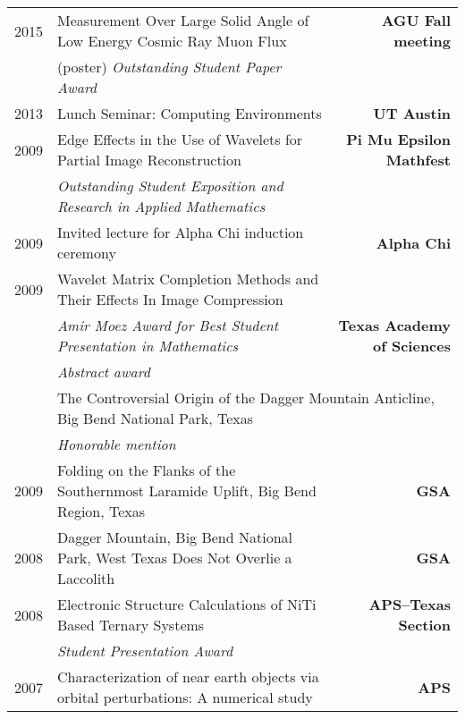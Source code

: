 \documentclass[10pt,letterpaper,english]{moderncv}
\begin{document}
\begin{tabularx}{\textwidth}{p{.35in}X>{\bfseries}r}
	
	2015 & Measurement Over Large Solid Angle of Low Energy Cosmic Ray Muon Flux &  AGU Fall meeting \\
	 & (poster) \emph{Outstanding Student Paper Award} & \\
	 2013 & Lunch Seminar: Computing Environments & UT Austin \\
	 2009 & Edge Effects in the Use of Wavelets for Partial Image Reconstruction & Pi Mu Epsilon Mathfest \\
	 & \emph{Outstanding Student Exposition and Research in Applied Mathematics} & \\
	 
	 2009 & Invited lecture for Alpha Chi induction ceremony & Alpha Chi  \\
	 
	 2009 & Wavelet Matrix Completion Methods and Their Effects In Image Compression &  \\
	  & \emph{Amir Moez Award for Best Student Presentation in Mathematics} & Texas Academy of Sciences \\
	  & \emph{Abstract award} & \\
	  & \multicolumn{2}{l}{The Controversial Origin of the Dagger Mountain Anticline, Big Bend National Park, Texas}  \\
	  & \emph{Honorable mention} & \\
	  
	  
	  2009 & Folding on the Flanks of the Southernmost Laramide Uplift, Big Bend Region, Texas & GSA \\[1em]
	  
	  2008 & Dagger Mountain, Big Bend National Park, West Texas Does Not Overlie a Laccolith & GSA \\[1em]
	 
	 2008 & Electronic Structure Calculations of NiTi Based Ternary Systems  & APS--Texas Section \\
	 & \emph{Student Presentation Award} & \\
	 
	 2007 & Characterization of near earth objects via orbital perturbations: A numerical study & APS
	 
\end{tabularx}


\end{document}
